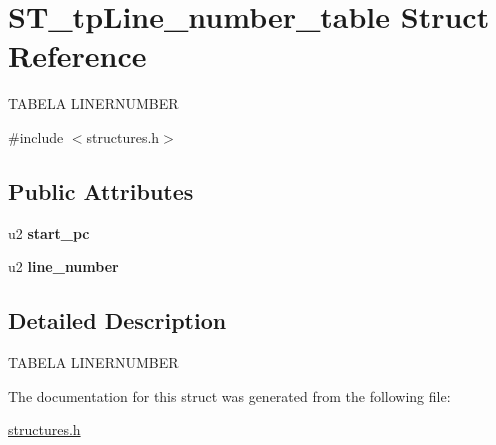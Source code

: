 \hypertarget{structST__tpLine__number__table}{}\section{S\+T\+\_\+tp\+Line\+\_\+number\+\_\+table Struct Reference}
\label{structST__tpLine__number__table}




 T\+A\+B\+E\+LA L\+I\+N\+E\+R\+N\+U\+M\+B\+ER  




{\ttfamily \#include $<$structures.\+h$>$}

\subsection*{Public Attributes}
\begin{DoxyCompactItemize}
\item 
\mbox{\label{structST__tpLine__number__table_a2284e47b1a53488de681557836f73cac}} 
u2 {\bfseries start\+\_\+pc}
\item 
\mbox{\label{structST__tpLine__number__table_a713541aa0ea5eb0116f8e9c55690b937}} 
u2 {\bfseries line\+\_\+number}
\end{DoxyCompactItemize}


\subsection{Detailed Description}


 T\+A\+B\+E\+LA L\+I\+N\+E\+R\+N\+U\+M\+B\+ER 

The documentation for this struct was generated from the following file\+:\begin{DoxyCompactItemize}
\item 
\mbox{\hyperlink{structures_8h}{structures.\+h}}\end{DoxyCompactItemize}
